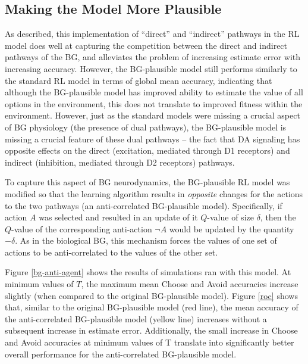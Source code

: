 \documentclass[10pt,letterpaper]{article}
\begin{document}
\subsection{Making the Model More Plausible}

As described, this implementation of ``direct'' and ``indirect'' pathways in the RL model does well at capturing the competition between the direct and indirect pathways of the BG, and alleviates the problem of increasing estimate error with increasing accuracy. However, the BG-plausible model still performs similarly to the standard RL model in terms of global mean accuracy, indicating that although the BG-plausible model has improved ability to estimate the value of all options in the environment, this does not translate to improved fitness within the environment. However, just as the standard models were missing a crucial aspect of BG physiology (the presence of dual pathways), the BG-plausible model is missing a crucial feature of these dual pathways -- the fact that DA signaling has opposite effects on the direct (excitation, mediated through D1 receptors) and indirect (inhibition, mediated through D2 receptors) pathways. 

To capture this aspect of BG neurodynamics, the BG-plausible RL model was modified so that the learning algorithm results in \emph{opposite} changes for the actions to the two pathways (an anti-correlated BG-plausible model). Specifically, if action $A$ was selected and resulted in an update  of it $Q$-value of size $\delta$, then the $Q$-value of the corresponding anti-action $\neg A$ would be updated by the quantity $-\delta$. As in the biological BG, this mechanism forces the values of one set of actions to be anti-correlated to the values of the other set.

Figure \ref{bg-anti-agent} shows the results of simulations ran with this model. At minimum values of $T$, the maximum mean Choose and Avoid accuracies increase slightly (when compared to the original BG-plausible model). Figure \ref{roc} shows that, similar to the original BG-plausible model (red line), the mean accuracy of the anti-correlated BG-plausible model (yellow line) increases without a subsequent increase in estimate error. Additionally, the small increase in Choose and Avoid accuracies at minimum values of T translate into significantly better overall performance for the anti-correlated BG-plausible model. 
\end{document}

